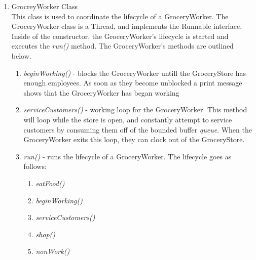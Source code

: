 \documentclass[12pt]{article}
\begin{document}
\begin{enumerate}
            \item GrocreyWorker Class \\ 
            This class is used to coordinate the lifecycle of a GroceryWorker. The GroceryWorker class is a Thread, and implements the Runnable interface. Inside of the constructor, the GroceryWorker's lifecycle is started and executes the \textit{run()} method. The GroceryWorker's methods are outlined below.
                \begin{enumerate}
                    \item \textit{beginWorking()} - blocks the GroceryWorker untill the GroceryStore has enough employees. As soon as they become unblocked a print message shows that the GroceryWorker has began working
                    \item \textit{serviceCustomers()} - working loop for the GroceryWorker. This method will loop while the store is open, and constantly attempt to service customers by consuming them off of the bounded buffer \textit{queue}. When the GroceryWorker exits this loop, they can clock out of the GroceryStore.
                    \item \textit{run()} - runs the lifecycle of a GroceryWorker. The lifecycle goes as follows:
                    \begin{enumerate}
                        \item \textit{eatFood()}
                        \item \textit{beginWorking()}
                        \item \textit{serviceCustomers()}
                        \item \textit{shop()}
                        \item \textit{nonWork()}
                    \end{enumerate}
                \end{enumerate}
        

\end{enumerate}
\end{document}
